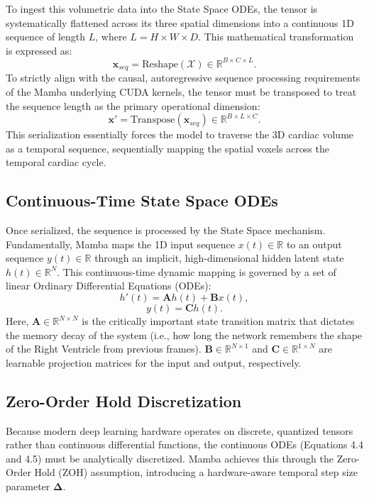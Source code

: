 To ingest this volumetric data into the State Space ODEs, the tensor is systematically flattened across its three spatial dimensions into a continuous 1D sequence of length $L$, where $L = H \times W \times D$. This mathematical transformation is expressed as:
\begin{equation}
    \mathbf{x}_{seq} = \text{Reshape}(\mathcal{X}) \in \mathbb{R}^{B \times C \times L}.
\end{equation}
To strictly align with the causal, autoregressive sequence processing requirements of the Mamba underlying CUDA kernels, the tensor must be transposed to treat the sequence length as the primary operational dimension:
\begin{equation}
    \mathbf{x}' = \text{Transpose}(\mathbf{x}_{seq}) \in \mathbb{R}^{B \times L \times C}.
\end{equation}
This serialization essentially forces the model to traverse the 3D cardiac volume as a temporal sequence, sequentially mapping the spatial voxels across the temporal cardiac cycle.

\subsection{Continuous-Time State Space ODEs}
Once serialized, the sequence is processed by the State Space mechanism. Fundamentally, Mamba maps the 1D input sequence $x(t) \in \mathbb{R}$ to an output sequence $y(t) \in \mathbb{R}$ through an implicit, high-dimensional hidden latent state $h(t) \in \mathbb{R}^N$. This continuous-time dynamic mapping is governed by a set of linear Ordinary Differential Equations (ODEs):
\begin{equation}
    h'(t) = \mathbf{A}h(t) + \mathbf{B}x(t),
\end{equation}
\begin{equation}
    y(t) = \mathbf{C}h(t).
\end{equation}
Here, $\mathbf{A} \in \mathbb{R}^{N \times N}$ is the critically important state transition matrix that dictates the memory decay of the system (i.e., how long the network remembers the shape of the Right Ventricle from previous frames). $\mathbf{B} \in \mathbb{R}^{N \times 1}$ and $\mathbf{C} \in \mathbb{R}^{1 \times N}$ are learnable projection matrices for the input and output, respectively.

\subsection{Zero-Order Hold Discretization}
Because modern deep learning hardware operates on discrete, quantized tensors rather than continuous differential functions, the continuous ODEs (Equations 4.4 and 4.5) must be analytically discretized. Mamba achieves this through the Zero-Order Hold (ZOH) assumption, introducing a hardware-aware temporal step size parameter $\mathbf{\Delta}$. 

